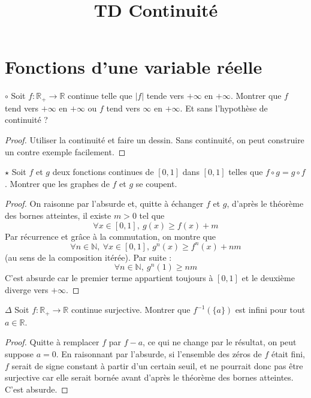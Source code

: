 \documentclass[french,a4paper]{article}
\title{TD Continuité}
\newcommand{\N}{\mathbb{N}}
\newcommand{\R}{\mathbb{R}}
\newcommand{\inv}{^{-1}}
\theoremstyle{plain}
\theoremstyle{definition}
\theoremstyle{remark}
\begin{document}
\maketitle

\section{Fonctions d'une variable réelle}

\begin{ex}[Moulin.01]{$\circ$}
	Soit $f:\R_+\to\R$ continue telle que $\lvert f\rvert$ tende vers $+\infty$ en $+\infty$. Montrer que $f$ tend vers $+\infty$ en $+\infty$ ou $f$ tend vers $\infty$ en $+\infty$. Et sans l'hypothèse de continuité ?
\end{ex}
\begin{proof}
	Utiliser la continuité et faire un dessin. Sans continuité, on peut construire un contre exemple facilement.
\end{proof}

\begin{ex}[Moulin.02]{$\star$}
	Soit $f$ et $g$ deux fonctions continues de $[0,1]$ dans $[0,1]$ telles que $f\circ g=g\circ f$. Montrer que les graphes de $f$ et $g$ se coupent.
\end{ex}
\begin{proof}
	On raisonne par l'absurde et, quitte à échanger $f$ et $g$, d'après le théorème des bornes atteintes, il existe $m>0$ tel que $$\forall x\in[0,1],\ g(x)\geqslant f(x)+m$$ Par récurrence et grâce à la commutation, on montre que $$\forall n\in\N,\ \forall x\in[0,1],\ g^n(x)\geqslant f^n(x)+nm$$ (au sens de la composition itérée).  Par suite : $$\forall n\in\N, \ g^n(1)\geqslant nm$$ C'est absurde car le premier terme appartient toujours à $[0,1]$ et le deuxième diverge vers $+\infty$.
\end{proof}

\begin{ex}[Moulin.03]{$\Delta$}
	Soit $f:\R_+\to\R$ continue surjective. Montrer que $f\inv\left(\{a\}\right)$ est infini pour tout $a\in\R$.
\end{ex}
\begin{proof}
	Quitte à remplacer $f$ par $f-a$, ce qui ne change par le résultat, on peut suppose $a=0$. En raisonnant par l'absurde, si l'ensemble des zéros de $f$ était fini, $f$ serait de signe constant à partir d'un certain seuil, et ne pourrait donc pas être surjective car elle serait bornée avant d'après le théorème des bornes atteintes. C'est absurde.
\end{proof}
\end{document}
